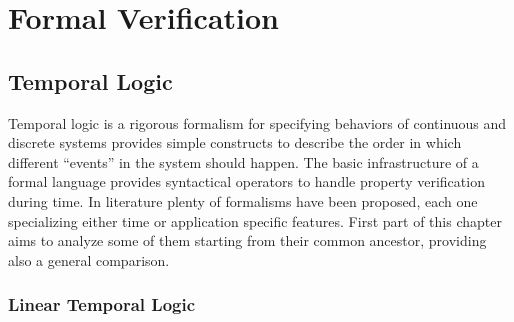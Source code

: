 \chapter{Formal Verification}

\section{Temporal Logic}
Temporal logic is a rigorous formalism for specifying behaviors of continuous and discrete systems \citep{pnueli1992temporal,manna2012temporal}
provides simple constructs to describe the order in which different “events” in the system
should happen. The basic infrastructure of a formal language provides syntactical operators to handle property verification during time. In literature plenty of formalisms have been proposed, each one specializing either time or application specific features. First part of this chapter aims to analyze some of them starting from their common ancestor, providing also a general comparison.

\subsection{Linear Temporal Logic}
\label{ssec:LTL}


